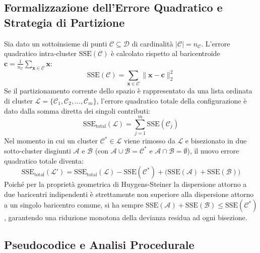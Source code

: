 \FloatBarrier
\subsection{Formalizzazione dell'Errore Quadratico e Strategia di Partizione}

Sia dato un sottoinsieme di punti $\mathcal{C} \subseteq \mathcal{D}$ di cardinalità $|\mathcal{C}| = n_{\mathcal{C}}$. L'errore quadratico intra-cluster $\mathrm{SSE}(\mathcal{C})$ è calcolato rispetto al baricentroide $\mathbf{c} = \frac{1}{n_{\mathcal{C}}} \sum_{\mathbf{x} \in \mathcal{C}} \mathbf{x}$:
\begin{equation}
\label{eq:dm-sse-single-cluster}
\mathrm{SSE}(\mathcal{C}) = \sum_{\mathbf{x} \in \mathcal{C}} \|\mathbf{x} - \mathbf{c}\|_2^2
\end{equation}
Se il partizionamento corrente dello spazio è rappresentato da una lista ordinata di cluster $\mathcal{L} = \{\mathcal{C}_1, \mathcal{C}_2, \dots, \mathcal{C}_m\}$, l'errore quadratico totale della configurazione è dato dalla somma diretta dei singoli contributi:
\begin{equation}
\label{eq:dm-sse-total-list}
\mathrm{SSE}_{\text{total}}(\mathcal{L}) = \sum_{j=1}^m \mathrm{SSE}(\mathcal{C}_j)
\end{equation}
Nel momento in cui un cluster $\mathcal{C}^* \in \mathcal{L}$ viene rimosso da $\mathcal{L}$ e bisezionato in due sotto-cluster disgiunti $\mathcal{A}$ e $\mathcal{B}$ (con $\mathcal{A} \cup \mathcal{B} = \mathcal{C}^*$ e $\mathcal{A} \cap \mathcal{B} = \emptyset$), il nuovo errore quadratico totale diventa:
\begin{equation}
\label{eq:dm-sse-split-delta}
\mathrm{SSE}_{\text{total}}(\mathcal{L}') = \mathrm{SSE}_{\text{total}}(\mathcal{L}) - \mathrm{SSE}(\mathcal{C}^*) + \big( \mathrm{SSE}(\mathcal{A}) + \mathrm{SSE}(\mathcal{B}) \big)
\end{equation}
Poiché per la proprietà geometrica di Huygens-Steiner la dispersione attorno a due baricentri indipendenti è strettamente non superiore alla dispersione attorno a un singolo baricentro comune, si ha sempre $\mathrm{SSE}(\mathcal{A}) + \mathrm{SSE}(\mathcal{B}) \le \mathrm{SSE}(\mathcal{C}^*)$, garantendo una riduzione monotona della devianza residua ad ogni bisezione.

\FloatBarrier
\subsection{Pseudocodice e Analisi Procedurale}

